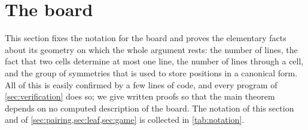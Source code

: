 \section{The board}\label{sec:board}

This section fixes the notation for the board and proves the elementary facts about its geometry on
which the whole argument rests: the number of lines, the fact that two cells determine at most one line,
the number of lines through a cell, and the group of symmetries that is used to store positions in a
canonical form. All of this is easily confirmed by a few lines of code, and every program of
\cref{sec:verification} does so; we give written proofs so that the main theorem depends on no computed
description of the board. The notation of this section and of \cref{sec:pairing,sec:leaf,sec:game} is
collected in \cref{tab:notation}.

